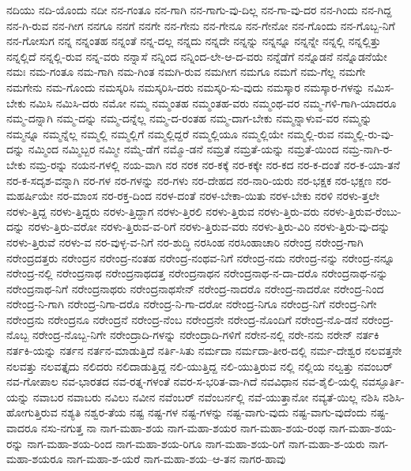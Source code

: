{ನದಿಯು
ನದಿ-ಯೊಂದು
ನದೀ
ನನ-ಗಂತೂ
ನನ-ಗಾಗಿ
ನನ-ಗಾಗು-ವು-ದಿಲ್ಲ
ನನ-ಗಾ-ವು-ದರ
ನನ-ಗಿಂದು
ನನ-ಗಿದ್ದ
ನನ-ಗಿ-ರುವ
ನನ-ಗೀಗ
ನನಗೂ
ನನಗೆ
ನನಗೇ
ನನ-ಗೇನು
ನನ-ಗೇನೂ
ನನ-ಗೇನೋ
ನನ-ಗೊಂದು
ನನ-ಗೊಬ್ಬ-ನಿಗೆ
ನನ-ಗೋಸುಗ
ನನ್ನ
ನನ್ನಂತಹ
ನನ್ನಂತೆ
ನನ್ನ-ದಲ್ಲ
ನನ್ನದು
ನನ್ನದೇ
ನನ್ನನ್ನು
ನನ್ನನ್ನೂ
ನನ್ನನ್ನೇ
ನನ್ನಲ್ಲಿ
ನನ್ನಲ್ಲಿತ್ತು
ನನ್ನಲ್ಲಿದೆ
ನನ್ನಲ್ಲಿ-ರುವ
ನನ್ನ-ವರು
ನನ್ನಾಸೆ
ನನ್ನಿಂದ
ನನ್ನಿಂದ-ಲೇ-ಆ-ದ-ವರು
ನನ್ನೆಡೆಗೆ
ನನ್ನೊಡನೆ
ನನ್ನೊಡನೆಯೇ
ನಮಃ
ನಮ-ಗಂತೂ
ನಮ-ಗಾಗಿ
ನಮ-ಗಿಂತ
ನಮಗಿ-ರುವ
ನಮಗೀಗ
ನಮಗೂ
ನಮಗೆ
ನಮ-ಗೆಲ್ಲ
ನಮಗೇ
ನಮಗೇನು
ನಮ-ಗೊಂದು
ನಮಸ್ಕರಿಸಿ
ನಮಸ್ಕರಿಸಿ-ದರು
ನಮಸ್ಕರಿ-ಸು-ವುದು
ನಮಸ್ಕಾರ
ನಮಸ್ಕಾರ-ಗಳನ್ನು
ನಮಿಸ-ಬೇಕು
ನಮಿಸಿ
ನಮಿಸಿ-ದರು
ನಮೋ
ನಮ್ಮ
ನಮ್ಮಂತಹ
ನಮ್ಮಂತಹ-ವರು
ನಮ್ಮಂಥ-ವರ
ನಮ್ಮ-ಗಳಿ-ಗಾಗಿ-ಯಾದರೂ
ನಮ್ಮ-ದನ್ನಾಗಿ
ನಮ್ಮ-ದನ್ನು
ನಮ್ಮ-ದನ್ನೆಲ್ಲ
ನಮ್ಮ-ದ-ರಂತಹ
ನಮ್ಮ-ದಾಗ-ಬೇಕು
ನಮ್ಮನ್ನಾಳುವ-ವರ
ನಮ್ಮನ್ನು
ನಮ್ಮನ್ನೂ
ನಮ್ಮನ್ನೆಲ್ಲ
ನಮ್ಮಲ್ಲಿ
ನಮ್ಮಲ್ಲಿಗೆ
ನಮ್ಮಲ್ಲಿದ್ದರೆ
ನಮ್ಮಲ್ಲಿಯೂ
ನಮ್ಮಲ್ಲಿಯೇ
ನಮ್ಮಲ್ಲಿ-ರುವ
ನಮ್ಮಲ್ಲಿ-ರು-ವು-ದನ್ನು
ನಮ್ಮಿಂದ
ನಮ್ಮಿಬ್ಬರ
ನಮ್ಮೀ
ನಮ್ಮೆ-ಡೆಗೆ
ನಮ್ಮೊ-ಡನೆ
ನಮ್ರತೆ
ನಮ್ರತೆ-ಯನ್ನು
ನಮ್ರತೆ-ಯಿಂದ
ನಮ್ರ-ನಾಗಿ-ರ-ಬೇಕು
ನಮ್ರ-ರನ್ನು
ನಯನ-ಗಳಲ್ಲಿ
ನಯ-ವಾಗಿ
ನರ
ನರಕ
ನರ-ಕಕ್ಕೆ
ನರ-ಕಕ್ಕೇ
ನರ-ಕದ
ನರ-ಕ-ದಂತೆ
ನರ-ಕ-ಯಾ-ತನೆ
ನರ-ಕ-ಸದೃಶ-ವನ್ನಾಗಿ
ನರ-ಗಳ
ನರ-ಗಳನ್ನು
ನರ-ಗಳು
ನರ-ದೇಹದ
ನರ-ನಾರಿ-ಯರು
ನರ-ಭಕ್ಷಕ
ನರ-ಭಕ್ಷಣ
ನರ-ಮಹರ್ಷಿಯೇ
ನರ-ಮಾಂಸ
ನರ-ರಕ್ತ-ದಿಂದ
ನರಳ-ದಂತೆ
ನರಳ-ಬೇಕಾ-ಯಿತು
ನರಳ-ಬೇಕು
ನರಳಿ
ನರಳು-ತ್ತಲೇ
ನರಳು-ತ್ತಿದ್ದ
ನರಳು-ತ್ತಿದ್ದರು
ನರಳು-ತ್ತಿದ್ದಾಗ
ನರಳು-ತ್ತಿರಲಿ
ನರಳು-ತ್ತಿರುವ
ನರಳು-ತ್ತಿರು-ವರು
ನರಳು-ತ್ತಿರುವ-ರೆಂಬು-ದನ್ನು
ನರಳು-ತ್ತಿರು-ವರೋ
ನರಳು-ತ್ತಿರುವ-ವ-ರಿಗೆ
ನರಳು-ತ್ತಿರುವ-ವರು
ನರಳು-ತ್ತಿರು-ವಿರಿ
ನರಳು-ತ್ತಿರು-ವು-ದನ್ನು
ನರಳು-ತ್ತಿರುವೆ
ನರಳು-ವ
ನರ-ವುಳ್ಳ-ವ-ನಿಗೆ
ನರ-ಶುದ್ಧಿ
ನರಸಿಂಹ
ನರಸಿಂಹಾಚಾರಿ
ನರೇಂದ್ರ
ನರೇಂದ್ರ-ಗಾಗಿ
ನರೇಂದ್ರದತ್ತರು
ನರೇಂದ್ರನ
ನರೇಂದ್ರ-ನಂತಹ
ನರೇಂದ್ರ-ನಂಥವ-ನಿಗೆ
ನರೇಂದ್ರ-ನದು
ನರೇಂದ್ರ-ನನ್ನು
ನರೇಂದ್ರ-ನನ್ನೂ
ನರೇಂದ್ರ-ನಲ್ಲಿ
ನರೇಂದ್ರನಾಥ
ನರೇಂದ್ರನಾಥದತ್ತ
ನರೇಂದ್ರನಾಥನ
ನರೇಂದ್ರನಾಥ-ನ-ದಾ-ದರೊ
ನರೇಂದ್ರನಾಥ-ನನ್ನು
ನರೇಂದ್ರನಾಥ-ನಿಗೆ
ನರೇಂದ್ರನಾಥರು
ನರೇಂದ್ರನಾಥಸೇನ್
ನರೇಂದ್ರ-ನಾದರೊ
ನರೇಂದ್ರ-ನಾದರೋ
ನರೇಂದ್ರ-ನಿಂದ
ನರೇಂದ್ರ-ನಿ-ಗಾಗಿ
ನರೇಂದ್ರ-ನಿಗಾ-ದರೊ
ನರೇಂದ್ರ-ನಿ-ಗಾ-ದರೋ
ನರೇಂದ್ರ-ನಿಗೂ
ನರೇಂದ್ರ-ನಿಗೆ
ನರೇಂದ್ರ-ನಿಗೇ
ನರೇಂದ್ರನು
ನರೇಂದ್ರನೂ
ನರೇಂದ್ರನೆ
ನರೇಂದ್ರ-ನೆಂಬ
ನರೇಂದ್ರನೇ
ನರೇಂದ್ರ-ನೊಂದಿಗೆ
ನರೇಂದ್ರ-ನೊ-ಡನೆ
ನರೇಂದ್ರ-ನೊಬ್ಬ
ನರೇಂದ್ರ-ನೊಬ್ಬ-ನಿಗೇ
ನರೇಂದ್ರಾದಿ-ಗಳನ್ನು
ನರೇಂದ್ರಾದಿ-ಗಳಿಗೆ
ನರೇನ-ನಲ್ಲಿ
ನರೇ-ನನು
ನರೇನ್
ನರ್ತಕಿ
ನರ್ತಕಿ-ಯನ್ನು
ನರ್ತನ
ನರ್ತನ-ಮಾಡುತ್ತಿದೆ
ನರ್ತಿ-ಸಿತು
ನರ್ಮದಾ
ನರ್ಮದಾ-ತೀರ-ದಲ್ಲಿ
ನರ್ಮ-ದೇಶ್ವರ
ನಲವತ್ತನೇ
ನಲವತ್ತು
ನಲವತ್ತೈದು
ನಲಿದರು
ನಲಿದಾಡುತ್ತಿದ್ದ
ನಲಿ-ಯುತ್ತಿದ್ದ
ನಲಿ-ಯುತ್ತಿರುವ
ನಲ್ಲಿ
ನಲ್ಲಿಯ
ನಲ್ವತ್ತು
ನವಂಬರ್
ನವ-ಗೋಪಾಲ
ನವ-ಭಾರತದ
ನವ-ರತ್ನ-ಗಳಂತೆ
ನವರ-ಸ-ಭರಿತ-ವಾ-ಗಿದೆ
ನವವಿಧಾನ
ನವ-ಶೈಲಿ-ಯಲ್ಲಿ
ನವಸ್ಫೂರ್ತಿ-ಯನ್ನು
ನವಾಬರ
ನವಾಬರು
ನವಿಲು
ನವೀನ
ನವೆಂಬರ್
ನವೆಂಬರ್ನಲ್ಲಿ
ನವೆ-ಯುತ್ತಾನೋ
ನವ್ಯತೆ-ಯಿಲ್ಲ
ನಶಿಸಿ
ನಶಿಸಿ-ಹೋಗುತ್ತಿರುವ
ನಶ್ಯತಿ
ನಶ್ವರ-ತೆಯ
ನಷ್ಟ
ನಷ್ಟ-ಗಳ
ನಷ್ಟ-ಗಳನ್ನು
ನಷ್ಟ-ವಾಗು-ವುದು
ನಷ್ಟ-ವಾಗು-ವುದೆಂದು
ನಷ್ಟ-ವಾದರೂ
ನಸು-ನಗುತ್ತ
ನಾ
ನಾಗ-ಮಹಾ-ಶಯ
ನಾಗ-ಮಹಾ-ಶಯರ
ನಾಗ-ಮಹಾ-ಶಯ-ರಂಥ
ನಾಗ-ಮಹಾ-ಶಯ-ರನ್ನು
ನಾಗ-ಮಹಾ-ಶಯ-ರಿಂದ
ನಾಗ-ಮಹಾ-ಶಯ-ರಿಗೂ
ನಾಗ-ಮಹಾ-ಶಯ-ರಿಗೆ
ನಾಗ-ಮಹಾ-ಶ-ಯರು
ನಾಗ-ಮಹಾ-ಶಯರೂ
ನಾಗ-ಮಹಾ-ಶ-ಯರೆ
ನಾಗ-ಮಹಾ-ಶಯ--ಆ-ತನ
ನಾಗರ-ಹಾವು
}
